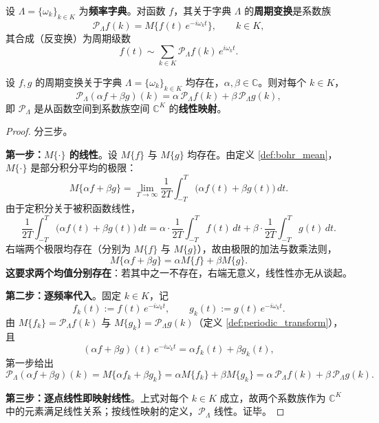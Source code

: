 \begin{definition}\label{def:periodic_transform}
设 $\Lambda = \{\omega_k\}_{k \in K}$ 为\textbf{频率字典}。对函数 $f$，其关于字典 $\Lambda$ 的\textbf{周期变换}是系数族
\[
\mathcal{P}_\Lambda f(k) = M\big\{ f(t)\, e^{-i\omega_k t} \big\}, \qquad k \in K,
\]
其合成（反变换）为周期级数
\[
f(t) \sim \sum_{k \in K} \mathcal{P}_\Lambda f(k)\, e^{i\omega_k t}.
\]
\end{definition}

\begin{proposition}[周期变换的线性性]\label{prop:periodic_transform_linear}
设 $f, g$ 的周期变换关于字典 $\Lambda = \{\omega_k\}_{k \in K}$ 均存在，$\alpha, \beta \in \mathbb{C}$。则对每个 $k \in K$，
\[
\mathcal{P}_\Lambda(\alpha f + \beta g)(k) = \alpha\, \mathcal{P}_\Lambda f(k) + \beta\, \mathcal{P}_\Lambda g(k),
\]
即 $\mathcal{P}_\Lambda$ 是从函数空间到系数族空间 $\mathbb{C}^K$ 的\textbf{线性映射}。
\end{proposition}

\begin{proof}
分三步。

\textbf{第一步：$M\{\cdot\}$ 的线性}。设 $M\{f\}$ 与 $M\{g\}$ 均存在。由定义 \ref{def:bohr_mean}，$M\{\cdot\}$ 是部分积分平均的极限：
\[
M\{\alpha f + \beta g\}
= \lim_{T \to \infty} \frac{1}{2T}\int_{-T}^{T} \bigl( \alpha f(t) + \beta g(t) \bigr)\,dt .
\]
由于定积分关于被积函数线性，
\[
\frac{1}{2T}\int_{-T}^{T} \bigl( \alpha f(t) + \beta g(t) \bigr)\,dt
= \alpha \cdot \frac{1}{2T}\int_{-T}^{T} f(t)\,dt + \beta \cdot \frac{1}{2T}\int_{-T}^{T} g(t)\,dt .
\]
右端两个极限均存在（分别为 $M\{f\}$ 与 $M\{g\}$），故由极限的加法与数乘法则，
\[
M\{\alpha f + \beta g\} = \alpha M\{f\} + \beta M\{g\} .
\]
\textbf{这要求两个均值分别存在}：若其中之一不存在，右端无意义，线性性亦无从谈起。

\textbf{第二步：逐频率代入}。固定 $k \in K$，记
\[
f_k(t) := f(t)\,e^{-i\omega_k t},\qquad g_k(t) := g(t)\,e^{-i\omega_k t}.
\]
由 $M\{f_k\} = \mathcal{P}_\Lambda f(k)$ 与 $M\{g_k\} = \mathcal{P}_\Lambda g(k)$（定义 \ref{def:periodic_transform}），且
\[
(\alpha f + \beta g)(t)\,e^{-i\omega_k t} = \alpha f_k(t) + \beta g_k(t),
\]
第一步给出
\[
\mathcal{P}_\Lambda(\alpha f + \beta g)(k)
= M\{\alpha f_k + \beta g_k\}
= \alpha M\{f_k\} + \beta M\{g_k\}
= \alpha\, \mathcal{P}_\Lambda f(k) + \beta\, \mathcal{P}_\Lambda g(k).
\]

\textbf{第三步：逐点线性即映射线性}。上式对每个 $k \in K$ 成立，故两个系数族作为 $\mathbb{C}^K$ 中的元素满足线性关系；按线性映射的定义，$\mathcal{P}_\Lambda$ 线性。证毕。
\end{proof}

